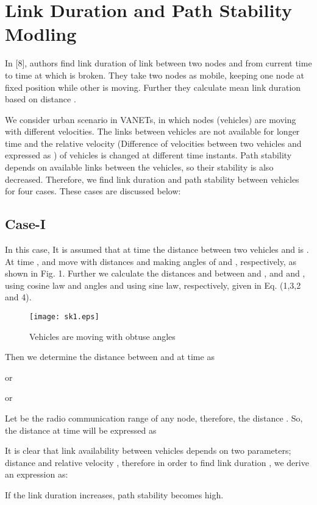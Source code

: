 \documentclass[journal]{IEEEtran}
\begin{document}
\section{Link Duration and Path Stability Modling}
In [8], authors find link duration  of link  between two nodes  and  from current time  to time at which  is broken. They take two nodes as mobile, keeping one node at fixed position while other is moving. Further they calculate mean link duration  based on distance .

We consider urban scenario in VANETs, in which nodes (vehicles) are moving with different velocities. The links between vehicles are not available for longer time and the relative velocity (Difference of velocities between two vehicles and expressed as ) of vehicles is changed at different time instants. Path stability depends on available links between the vehicles, so their stability is also decreased. Therefore, we find link duration and path stability between vehicles for four cases. These cases are discussed below:

\subsection{Case-I}
In this case, It is assumed that at time  the distance between two vehicles  and  is . At time ,  and  move with distances  and  making angles of  and , respectively, as shown in Fig. 1. Further we calculate the distances  and  between  and , and  and , using cosine law and angles  and  using sine law, respectively, given in Eq. (1,3,2 and 4).
\begin{figure}[h]
  \centering
  {\texttt{[image: sk1.eps]}}
  \caption{Vehicles are moving with obtuse angles}
\end{figure}




Then we determine the distance  between  and  at time  as

or

or

Let  be the radio communication range of any node, therefore, the distance . So, the distance  at time  will be expressed as

It is clear that link availability between vehicles depends on two parameters; distance  and relative velocity , therefore in order to find link duration , we derive an expression as:

If the link duration increases, path stability becomes high.
\end{document}
